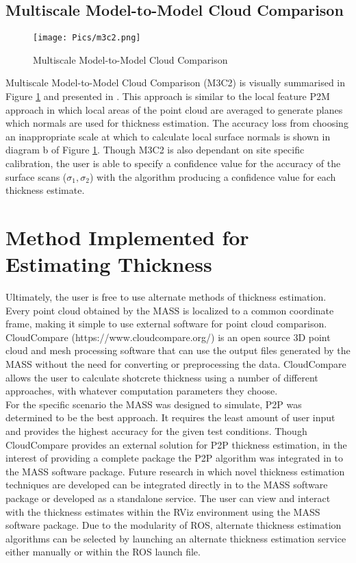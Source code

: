 \subsection{Multiscale Model-to-Model Cloud Comparison}
\begin{figure}[h!]
    \centering
    \texttt{[image: Pics/m3c2.png]}
    \caption{Multiscale Model-to-Model Cloud Comparison \cite{thick1}}
    \label{fig:m3c2}
\end{figure}

Multiscale Model-to-Model Cloud Comparison (M3C2) is visually summarised in Figure \ref{fig:m3c2} and presented in \cite{thick2}. This approach is similar to the local feature P2M approach in which local areas of the point cloud are averaged to generate planes which normals are used for thickness estimation. The accuracy loss from choosing an inappropriate scale at which to calculate local surface normals is shown in diagram b of Figure \ref{fig:m3c2}. Though M3C2 is also dependant on site specific calibration, the user is able to specify a confidence value for the accuracy of the surface scans ($\sigma_1,\sigma_2$) with the algorithm producing a confidence value for each thickness estimate.\\

\section{Method Implemented for Estimating Thickness}
Ultimately, the user is free to use alternate methods of thickness estimation. Every point cloud obtained by the MASS is localized to a common coordinate frame, making it simple to use external software for point cloud comparison. CloudCompare (https://www.cloudcompare.org/) is an open source 3D point cloud and mesh processing software that can use the output files generated by the MASS without the need for converting or preprocessing the data. CloudCompare allows the user to calculate shotcrete thickness using a number of different approaches, with whatever computation parameters they choose.\\

For the specific scenario the MASS was designed to simulate, P2P was determined to be the best approach. It requires the least amount of user input and provides the highest accuracy for the given test conditions. Though CloudCompare provides an external solution for P2P thickness estimation, in the interest of providing a complete package the P2P algorithm was integrated in to the MASS software package. Future research in which novel thickness estimation techniques are developed can be integrated directly in to the MASS software package or developed as a standalone service. The user can view and interact with the thickness estimates within the RViz environment using the MASS software package. Due to the modularity of ROS, alternate thickness estimation algorithms can be selected by launching an alternate thickness estimation service either manually or within the ROS launch file.\\